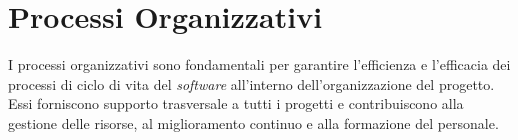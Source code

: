 \section{Processi Organizzativi}
\label{sec:processi_organizzativi}

I processi organizzativi sono fondamentali per garantire l'efficienza e l'efficacia
dei processi di ciclo di vita del \textit{software} all'interno dell'organizzazione
del progetto. Essi forniscono supporto trasversale a tutti i
progetti e contribuiscono alla gestione delle risorse, al miglioramento
continuo e alla formazione del personale.





